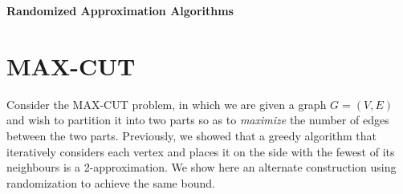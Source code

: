 \documentclass{article}
\begin{document}
%


%
%
%
%

%




\begin{center}
{\large \bf Randomized Approximation Algorithms}
\end{center}

\section{MAX-CUT}

Consider the MAX-CUT problem, in which we are given a graph $G=(V,E)$ and wish to partition it into two parts so as to \emph{maximize} the number of edges between the two parts.  Previously, we showed that a greedy algorithm that iteratively considers each vertex and places it on the side with the fewest of its neighbours is a 2-approximation.  We show here an alternate construction using randomization to achieve the same bound.
\end{document}
